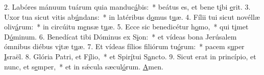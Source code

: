 2. Labóres mánuum tuárum quia manduc\uline{á}bis:~* beátus es, et bene t\uline{i}bi \uline{e}rit.
3. Uxor tua sicut vitis ab\uline{ú}ndans:~* in latéribus d\uline{o}mus t\uline{u}æ.
4. Fílii tui sicut novéllæ oliv\uline{á}rum:~* in circúitu m\uline{e}nsæ t\uline{u}æ.
5. Ecce sic benedicétur h\uline{o}mo,~* qui t\uline{i}met D\uline{ó}minum.
6. Benedícat tibi Dóminus ex S\uline{i}on:~* et vídeas bona Jerúsalem ómnibus diébus v\uline{i}tæ t\uline{u}æ.
7. Et vídeas fílios filiórum tu\uline{ó}rum:~* pacem s\uline{u}per \uline{I}sraël.
8. Glória Patri, et F\uline{í}lio,~* et Spir\uline{í}tui S\uline{a}ncto.
9. Sicut erat in princípio, et nunc, et s\uline{e}mper,~* et in sǽcula sæcul\uline{ó}rum. \uline{A}men.
